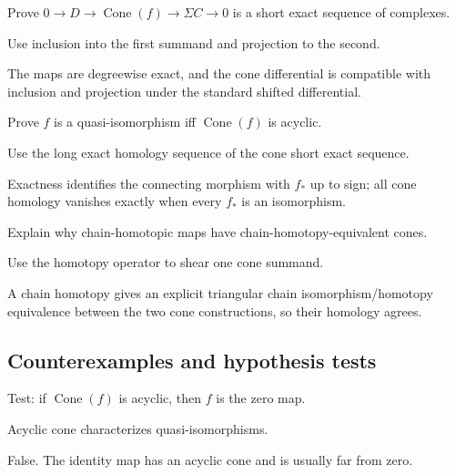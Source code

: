 \begin{exercise}\label{exr:viii24-ped-07}
Prove $0\to D\to\operatorname{Cone}(f)\to\Sigma C\to0$ is a short exact sequence of complexes.
\end{exercise}
\begin{hint}
Use inclusion into the first summand and projection to the second.
\end{hint}
\begin{solution}
The maps are degreewise exact, and the cone differential is compatible with inclusion and projection under the standard shifted differential.
\end{solution}

\begin{exercise}\label{exr:viii24-ped-08}
Prove $f$ is a quasi-isomorphism iff $\operatorname{Cone}(f)$ is acyclic.
\end{exercise}
\begin{hint}
Use the long exact homology sequence of the cone short exact sequence.
\end{hint}
\begin{solution}
Exactness identifies the connecting morphism with $f_*$ up to sign; all cone homology vanishes exactly when every $f_*$ is an isomorphism.
\end{solution}

\begin{exercise}\label{exr:viii24-ped-09}
Explain why chain-homotopic maps have chain-homotopy-equivalent cones.
\end{exercise}
\begin{hint}
Use the homotopy operator to shear one cone summand.
\end{hint}
\begin{solution}
A chain homotopy gives an explicit triangular chain isomorphism/homotopy equivalence between the two cone constructions, so their homology agrees.
\end{solution}

\subsection*{Counterexamples and hypothesis tests}

\begin{exercise}\label{exr:viii24-ped-10}
Test: if $\operatorname{Cone}(f)$ is acyclic, then $f$ is the zero map.
\end{exercise}
\begin{hint}
Acyclic cone characterizes quasi-isomorphisms.
\end{hint}
\begin{solution}
False. The identity map has an acyclic cone and is usually far from zero.
\end{solution}

